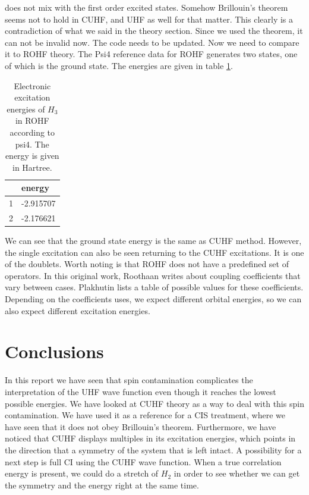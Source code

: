 \documentclass[twoside,twocolumn,9pt]{article}
\renewcommand{\refname}{Notes and references}
\begin{document}
does not mix with the first order excited states. Somehow Brillouin's theorem seems not to hold in CUHF, and UHF as well for that matter. This clearly is a contradiction of what we 
said in the theory section. Since we used the theorem, it can not be invalid now. The code needs to be updated. Now we need to compare it to ROHF theory.
The Psi4 reference data for ROHF generates two states, one of which is the ground state. The energies are given in table \ref{tab:ROHF}.
\begin{table}[h]
  \caption{Electronic excitation energies of $H_3$ in ROHF according to psi4. The energy is given in Hartree.}
  \label{tab:ROHF}
  \begin{tabular}{l|l}
      & energy    \\
    \hline
    1 & -2.915707 \\
    2 & -2.176621
  \end{tabular}
\end{table}
We can see that the ground state energy is the same as CUHF method. However, the single excitation can also be seen returning to the CUHF excitations. It is one of the doublets.
Worth noting is that ROHF does not have a predefined set of operators. In this original work, Roothaan writes about coupling coefficients that vary between cases\cite{Roothaan1960}.
Plakhutin lists a table of possible values for these coefficients\cite{Plakhutin2014}. Depending on the coefficients uses, we expect different orbital energies, so we can also
expect different excitation energies.


\section{Conclusions}
In this report we have seen that spin contamination complicates the interpretation of the UHF wave function even though it reaches the lowest possible energies. We have looked at
CUHF theory as a way to deal with this spin contamination. We have used it as a reference for a CIS treatment, where we have seen that it does not obey Brillouin's theorem.
Furthermore, we have noticed that CUHF displays multiples in its excitation energies, which points in the direction that a symmetry of the system that is left intact. A possibility for a
next step is full CI using the CUHF wave function. When a true correlation energy is present, we could do a stretch of $H_2$ in order to see whether we can get the symmetry and
the energy right at the same time.





\balance


\end{document}
